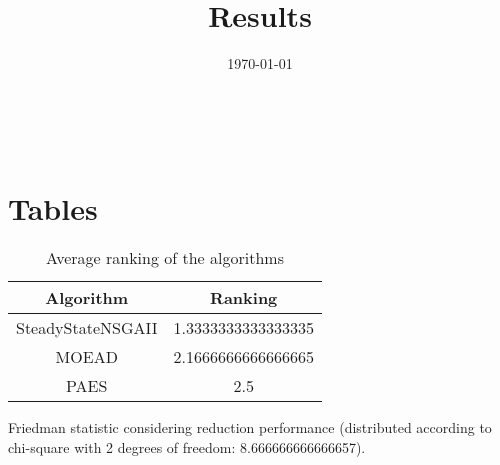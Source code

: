 \documentclass{article}
\title{Results}
\author{}
\date{\today}
\begin{document}
\oddsidemargin 0in \topmargin 0in\maketitle
\
\section{Tables}
\begin{table}[!htp]
\centering
\caption{Average ranking of the algorithms}
\begin{tabular}{c|c}
Algorithm&Ranking\\
\hline
SteadyStateNSGAII&1.3333333333333335\\
MOEAD&2.1666666666666665\\
PAES&2.5\\
\end{tabular}
\end{table}


Friedman statistic considering reduction performance (distributed according to chi-square with 2 degrees of freedom: 8.666666666666657).
\end{document}
